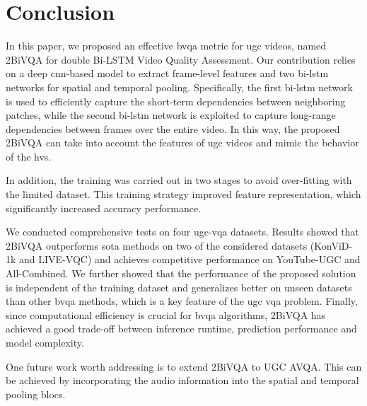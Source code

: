 \documentclass[journal]{IEEEtran}
\begin{document}
\section{Conclusion}
\label{cncls}
In this paper, we proposed an effective \ac{bvqa} metric for \ac{ugc} videos, named 2BiVQA for double Bi-LSTM Video Quality Assessment. Our contribution relies on a deep \ac{cnn}-based model to extract frame-level features and two \ac{bi-lstm} networks for spatial and temporal pooling. Specifically, the first \ac{bi-lstm} network is used to eﬀiciently capture the short-term dependencies between neighboring patches, while the second \ac{bi-lstm} network is exploited to capture long-range dependencies between frames over the entire video. In this way, the proposed 2BiVQA can take into account the features of \ac{ugc} videos and mimic the behavior of the  \ac{hvs}. 

In addition, the training was carried out in two stages to avoid over-fitting with the limited dataset. This training strategy improved feature representation, which significantly increased accuracy performance.

We conducted comprehensive tests on four \ac{ugc}-\ac{vqa} datasets. Results showed that 2BiVQA outperforms \ac{sota} methods on two of the considered datasets (KonViD-1k and LIVE-VQC) and achieves competitive performance on YouTube-UGC and All-Combined. We further showed that the performance of the proposed solution is independent of the training dataset and generalizes better on unseen datasets than other \ac{bvqa} methods, which is a key feature of the \ac{ugc} \ac{vqa} problem. Finally, since computational efficiency is crucial for \ac{bvqa} algorithms, 2BiVQA has achieved a good trade-off between inference runtime, prediction performance and model complexity.

One future work worth addressing is to extend 2BiVQA to UGC AVQA. This can be achieved by incorporating the audio information into the spatial and temporal pooling blocs.


\ifCLASSOPTIONcaptionsoff
  \newpage
\fi





















\end{document}
